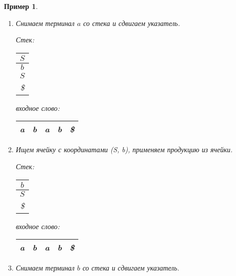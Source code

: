 \documentclass[10pt]{article}         %
\newtheorem{example}{Пример}
\begin{document}
\begin{example}
\begin{enumerate}
			Стек: \,
			\begin{tabular}[c]{ |c| } 
				\\ \hline
				$a$ \\ \hline
				$S$ \\ \hline
				$b$ \\ \hline
				$S$ \\ \hline
				\$ \\ \hline
			\end{tabular}  
			\qquad  \qquad \qquad  \qquad входное слово: \,
			\begin{tabular}[c]{ |c|c|c|c|c| } 
				\hline
				a & b & \textbf{a} & b & \$ \\ \hline
			\end{tabular}
			
			\item Снимаем терминал $a$ со стека и сдвигаем указатель.
			
			Стек: \,
			\begin{tabular}[c]{ |c| } 
				\\ \hline
				$S$ \\ \hline
				$b$ \\ \hline
				$S$ \\ \hline
				\$ \\ \hline
			\end{tabular}  
			\qquad  \qquad \qquad  \qquad входное слово: \,
			\begin{tabular}[c]{ |c|c|c|c|c| } 
				\hline
				a & b & a & \textbf{b} & \$ \\ \hline
			\end{tabular}
			
			\item Ищем ячейку с координатами (S, b), применяем продукцию из ячейки.
			
			Стек: \,
			\begin{tabular}[c]{ |c| } 
				\\ \hline
				$b$ \\ \hline
				$S$ \\ \hline
				\$ \\ \hline
			\end{tabular}  
			\qquad  \qquad \qquad  \qquad входное слово: \,
			\begin{tabular}[c]{ |c|c|c|c|c| } 
				\hline
				a & b & a & \textbf{b} & \$ \\ \hline
			\end{tabular}
			
			\item Снимаем терминал $b$ со стека и сдвигаем указатель.
			

\end{enumerate}
\end{example}
\end{document}
